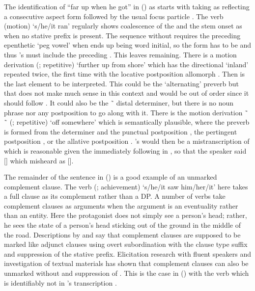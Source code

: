 The identification of  “far up when he got” in (\lastx) as  starts with taking  as reflecting a consecutive aspect form followed by the usual focus particle .
The verb  (motion) ‘s/he/it ran’ regularly shows coalescence of the  and the stem onset as  when no stative  prefix is present.
The sequence  without  requires the preceding epenthetic ‘peg vowel’  when  ends up being word initial, so the form has to be  and thus \citeauthor{swanton:1909}’s  must include the preceding .
This leaves  remaining.
There is a motion derivation  (;  repetitive) ‘further up from shore’ which has the directional  ‘inland’ repeated twice, the first time with the locative postposition allomorph .
Then  is the last element to be interpreted.
This could be the  ‘alternating’ preverb but that does not make much sense in this context and would be out of order since it should follow .
It could also be the  \~\  distal determiner, but there is no noun phrase nor any postposition to go along with it.
There is the motion derivation  \~\  \~\  (;  repetitive) ‘off somewhere’ which is semantically plausible, where the preverb is formed from the  determiner and the punctual postposition , the pertingent postposition , or the allative postposition .
\citeauthor{swanton:1909}’s  would then be a mistranscription of  which is reasonable given the immediately following  in , so that the speaker said [] which \citeauthor{swanton:1909} misheard as [].

The remainder of the sentence in (\lastx) is a good example of an unmarked complement clause.
The verb  (; achievement) ‘s/he/it saw him/her/it’ here takes a full clause as its complement rather than a DP.
A number of verbs take complement clauses as arguments when the argument is an eventuality rather than an entity.
Here the protagonist does not simply see a person’s head; rather, he sees the state of a person’s head sticking out of the ground in the middle of the road.
Descriptions by \textcite{naish:1966} and \textcite{leer:1991} say that complement clauses are supposed to be marked like adjunct clauses using overt subordination with the  clause type suffix and suppression of the  stative prefix.
Elicitation research with fluent speakers and investigation of textual materials has shown that complement clauses can also be unmarked without  and suppression of .
This is the case in (\lastx) with the verb  which is identifiably not  in \citeauthor{swanton:1909}’s transcription .

